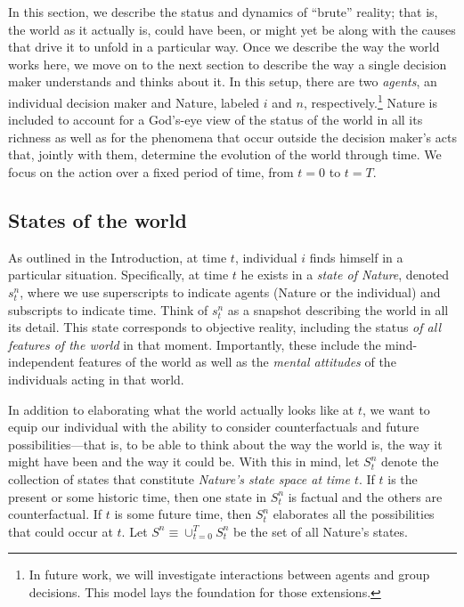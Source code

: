 \documentclass[
11pt,
titlepage,
reqno,
]{article}%
\theoremstyle{definition}
\begin{document}
In this section, we describe the status and dynamics of ``brute'' reality; that is, the world as it actually is, could have been, or might yet be along with the causes that drive it to unfold in a particular way. 
Once we describe the way the world works here, we move on to the next section to describe the way a single decision maker understands and thinks about it.
In this setup, there are two \textit{agents}, an individual decision maker and Nature, labeled $i$ and $n$, respectively.\footnote
{
	In future work, we will investigate interactions between agents and group decisions.
	This model lays the foundation for those extensions.
} 
Nature is included to account for  a God's-eye view of the status of the world in all its richness as well as for the phenomena that occur outside the decision maker's acts that, jointly with them, determine the evolution of the world through time. 
We focus on the action over a fixed period of time, from $t=0$ to $t=T$.
 


\subsection{States of the world\label{sec:states}}

As outlined in the Introduction, at time $t$, individual $i$ finds himself in a particular situation.
Specifically, at time $t$ he exists in a \textit{state of Nature}, denoted $s^n_t$, where we use superscripts  to indicate agents (Nature or the individual) and subscripts to indicate time.
Think of $s^n_t$ as a snapshot describing the world in all its detail.
This state corresponds to objective reality, including the status \textit{of all features of the world} in that moment. 
Importantly, these include the  mind-independent features of the world as well as the \textit{mental attitudes} of the individuals acting in that world. 

In addition to elaborating what the world actually looks like at $t$, we want to equip our individual with the ability to consider counterfactuals and future possibilities---that is, to be able to think about the way the world is, the way it might have been and the way it could be.
With this in mind, let $S^n_t$ denote the collection of states that constitute \textit{Nature's state space at time $t$}. 
If $t$ is the present or some historic time, then one state in  $S^n_t$ is factual and the others are counterfactual. 
If $t$ is some future time, then $S^n_t$ elaborates all the possibilities that could occur at $t$.
Let $S^n\equiv\cup_{t=0}^T S^n_t$ be the set of all Nature's states.
\end{document}
